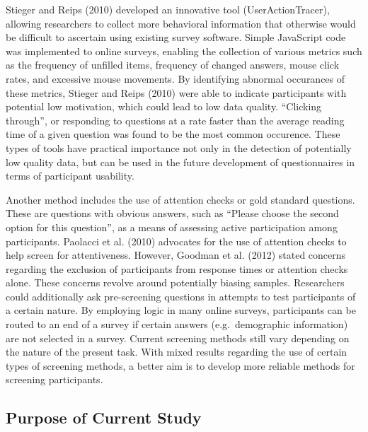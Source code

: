 \documentclass[english,man]{apa6}
\theoremstyle{definition}
\theoremstyle{definition}
\theoremstyle{definition}
\theoremstyle{remark}
\begin{document}
Stieger and Reips (2010) developed an innovative tool
(UserActionTracer), allowing researchers to collect more behavioral
information that otherwise would be difficult to ascertain using
existing survey software. Simple JavaScript code was implemented to
online surveys, enabling the collection of various metrics such as the
frequency of unfilled items, frequency of changed answers, mouse click
rates, and excessive mouse movements. By identifying abnormal occurances
of these metrics, Stieger and Reips (2010) were able to indicate
participants with potential low motivation, which could lead to low data
quality. \enquote{Clicking through}, or responding to questions at a
rate faster than the average reading time of a given question was found
to be the most common occurence. These types of tools have practical
importance not only in the detection of potentially low quality data,
but can be used in the future development of questionnaires in terms of
participant usability.

Another method includes the use of attention checks or gold standard
questions. These are questions with obvious answers, such as
\enquote{Please choose the second option for this question}, as a means
of assessing active participation among participants. Paolacci et al.
(2010) advocates for the use of attention checks to help screen for
attentiveness. However, Goodman et al. (2012) stated concerns regarding
the exclusion of participants from response times or attention checks
alone. These concerns revolve around potentially biasing samples.
Researchers could additionally ask pre-screening questions in attempts
to test participants of a certain nature. By employing logic in many
online surveys, participants can be routed to an end of a survey if
certain answers (e.g.~demographic information) are not selected in a
survey. Current screening methods still vary depending on the nature of
the present task. With mixed results regarding the use of certain types
of screening methods, a better aim is to develop more reliable methods
for screening participants.

\subsection{Purpose of Current Study}\label{purpose-of-current-study}
\end{document}
